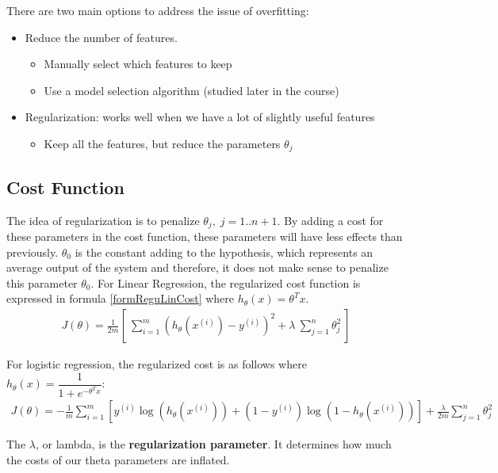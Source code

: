 There are two main options to address the issue of overfitting:
\begin{itemize}
	\item Reduce the number of features.
	\begin{itemize}
		\item Manually select which features to keep
		\item Use a model selection algorithm (studied later in the course)
	\end{itemize}
	\item Regularization: works well when we have a lot of slightly useful features
	\begin{itemize}
		\item Keep all the features, but reduce the parameters $\theta_j$
	\end{itemize}
\end{itemize}

\subsection{Cost Function}
The idea of regularization is to penalize $\theta_j, \; j=1..n+1$. By adding a cost for these parameters in the cost function, these parameters will have less effects than previously. $\theta_0$ is the constant adding to the hypothesis, which represents an average output of the system and therefore, it does not make sense to penalize this parameter $\theta_0$. For Linear Regression, the regularized cost function is expressed in formula \eqref{formReguLinCost} where $h_\theta(x) = \theta^Tx$.
\begin{align} \label{formReguLinCost}
J(\theta) = \frac{1}{2m} \left[ \ \sum_{i=1}^m (h_\theta(x^{(i)}) - y^{(i)})^2 + \lambda\ \sum_{j=1}^n \theta_j^2 \ \right]
\end{align}

For logistic regression, the regularized cost is as follows where $ h_\theta(x) = \dfrac{1}{1 + e^{-\theta^Tx}}$:
\begin{align} \label{formReguLogisCost}
J(\theta) = - \frac{1}{m} \sum_{i=1}^m [ y^{(i)}\log(h_\theta (x^{(i)})) + (1 - y^{(i)})\log (1 - h_\theta(x^{(i)})) ] + \frac{\lambda}{2m}\sum_{j=1}^n \theta_j^2
\end{align}

The $\lambda$, or lambda, is the \textbf{regularization parameter}. It determines how much the costs of our theta parameters are inflated.

